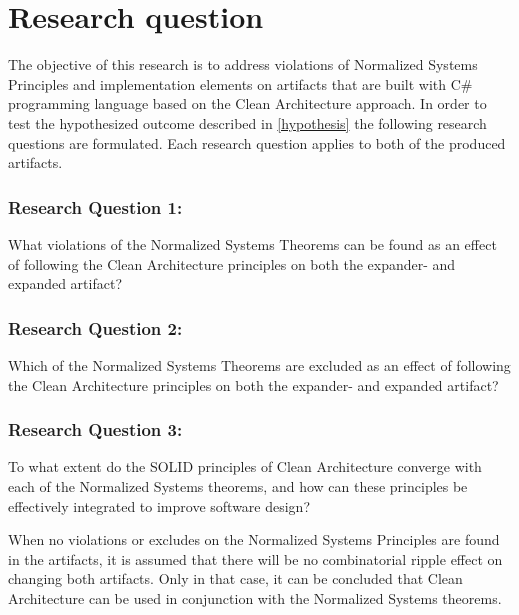 \section{Research question} \label{sec:research_questions}

The objective of this research is to address violations of Normalized Systems Principles
and implementation elements on artifacts that are built with C\# programming language
based on the Clean Architecture approach. In order to test the hypothesized outcome
described in \ref{hypothesis} the following research questions are formulated. Each
research question applies to both of the produced artifacts.

\subsubsection*{Research Question 1:} \label{rq1}
What violations of the Normalized Systems Theorems can be found as an effect of
following the Clean Architecture principles on both the expander- and expanded artifact?

\subsubsection*{Research Question 2:} \label{rq2}
Which of the Normalized Systems Theorems are excluded as an effect of following the
Clean Architecture principles on both the expander- and expanded artifact?

\subsubsection*{Research Question 3:} \label{rq3}
To what extent do the SOLID principles of Clean Architecture converge with each of the
Normalized Systems theorems, and how can these principles be effectively integrated to
improve software design?

When no violations or excludes on the Normalized Systems Principles are found in the
artifacts, it is assumed that there will be no combinatorial ripple effect on changing
both artifacts. Only in that case, it can be concluded that Clean Architecture can be
used in conjunction with the Normalized Systems theorems. 